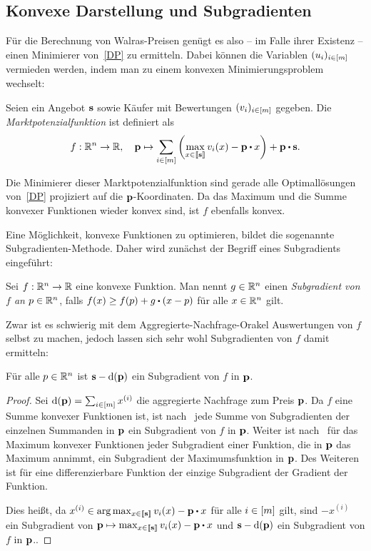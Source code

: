 
\subsection{Konvexe Darstellung und Subgradienten}

Für die Berechnung von Walras-Preisen genügt es also -- im Falle ihrer Existenz -- einen Minimierer von~\eqref{DP} zu ermitteln.
Dabei können die Variablen $(u_i)_{i\in\left[ m \right]}$ vermieden werden, indem man zu einem konvexen Minimierungsproblem wechselt:
\begin{definition}
	Seien ein Angebot $\mathbf{s}$ sowie Käufer mit Bewertungen $(v_i)_{i\in\left[ m \right]}$ gegeben. Die \emph{Marktpotenzialfunktion} ist definiert als
	\[ f:\R^n \rightarrow \R,\quad \fp \mapsto \sum_{i\in\first{m}} \left( \max_{x\in\ffirst{\fs}} v_i(x) - \fp \bcdot x \right) + \fp \bcdot \fs. \]
\end{definition}
Die Minimierer dieser Marktpotenzialfunktion sind gerade alle Optimallösungen von~\eqref{DP} projiziert auf die $\mathbf{p}$-Koordinaten.
Da das Maximum und die Summe konvexer Funktionen wieder konvex sind, ist $f$ ebenfalls konvex.

Eine Möglichkeit, konvexe Funktionen zu optimieren, bildet die sogenannte Subgradienten-Methode.
Daher wird zunächst der Begriff eines Subgradients eingeführt:
\begin{definition}[Subgradient]
	Sei $f:\mathbb{R}^n \rightarrow \mathbb{R}$ eine konvexe Funktion.
	Man nennt $g\in\mathbb{R}^n$ einen \emph{Subgradient von $f$ an $p\in\mathbb{R}^n$}, falls $f(x) \geq f(p) + g\bcdot (x - p)$ für alle $x\in\mathbb{R}^n$ gilt.
\end{definition}

Zwar ist es schwierig mit dem Aggregierte-Nachfrage-Orakel Auswertungen von $f$ selbst zu machen, jedoch lassen sich sehr wohl Subgradienten von $f$ damit ermitteln:
\begin{lemma}
	Für alle $p\in\mathbb{R}^n$ ist $\mathbf{s} - \operatorname{d}(\mathbf{p})$ ein Subgradient von $f$ in $\mathbf{p}$.
\end{lemma}
\begin{proof}
	Sei $\operatorname{d}(\mathbf{p}) = \sum_{i\in[m]} x^{(i)}$ die aggregierte Nachfrage zum Preis $\mathbf{p}$.
	Da $f$ eine Summe konvexer Funktionen ist, ist nach~\cite[Theorem~1.12]{Shor1985} jede Summe von Subgradienten der einzelnen Summanden in $\mathbf{p}$ ein Subgradient von $f$ in $\mathbf{p}$.
	Weiter ist nach~\cite[Theorem~1.13]{Shor1985} für das Maximum konvexer Funktionen jeder Subgradient einer Funktion, die in $\mathbf{p}$ das Maximum annimmt, ein Subgradient der Maximumsfunktion in $\mathbf{p}$.
	Des Weiteren ist für eine differenzierbare Funktion der einzige Subgradient der Gradient der Funktion.
	
	Dies heißt, da $x^{(i)}\in \arg\max_{x\in\ffirst{\fs}} v_i(x) - \fp \bcdot x$ für alle $i\in\left[ m \right]$ gilt, sind $-x^{(i)}$ ein Subgradient von $\fp \mapsto \max_{x\in\ffirst{\fs}} v_i(x) - \fp \bcdot x$ und $\mathbf{s} - \operatorname{d}(\mathbf{p})$ ein Subgradient von $f$ in $\mathbf{p}$..
\end{proof}